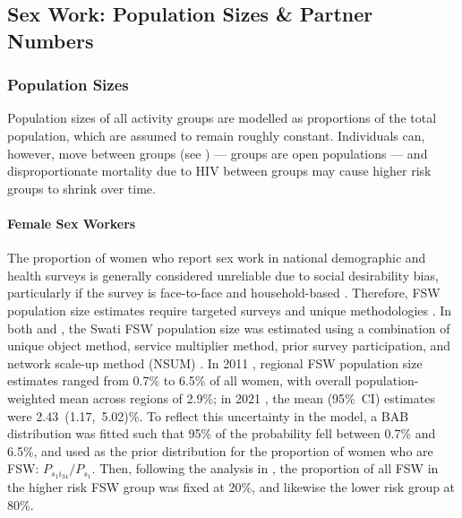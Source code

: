 \subsection{Sex Work: Population Sizes \& Partner Numbers}\label{model.par.sw}
\subsubsection{Population Sizes}\label{model.par.sw.size}
Population sizes of all activity groups are modelled as proportions of the total population,
which are assumed to remain roughly constant.
Individuals can, however, move between groups (see )
--- \ie groups are open populations ---
and disproportionate mortality due to HIV between groups
may cause higher risk groups to shrink over time.
\paragraph{Female Sex Workers}
The proportion of women who report sex work in national demographic and health surveys
is generally considered unreliable due to social desirability bias,
particularly if the survey is face-to-face and household-based
\cite{Konings1995,Gregson2002,Gregson2004,Lowndes2012,Behanzin2013}.
Therefore, FSW population size estimates require
targeted surveys and unique methodologies \cite{UNAIDS2010kps,Abdul-Quader2014}.
In both \cite{EswKP2014} and \cite{EswIBBS2022}, the Swati FSW population size
was estimated using a combination of
unique object method, service multiplier method, prior survey participation,
and network scale-up method (NSUM) \cite{UNAIDS2010kps}.
In 2011 \cite{EswKP2014}, regional FSW population size estimates
ranged from 0.7\% to 6.5\% of all women,
with overall population-weighted mean across regions of 2.9\%;
in 2021 \cite{EswIBBS2022}, the mean (95\%~CI) estimates were 2.43~(1.17,~5.02)\%.
To reflect this uncertainty in the model, a BAB distribution was fitted
such that 95\% of the probability fell between 0.7\% and 6.5\%,
and used as the prior distribution for the proportion of women who are FSW:
$P_{s_{1}i_{34}} / P_{s_{1}}$.
Then, following the analysis in ,
the proportion of all FSW in the higher risk FSW group was fixed at 20\%,
and likewise the lower risk group at 80\%.
